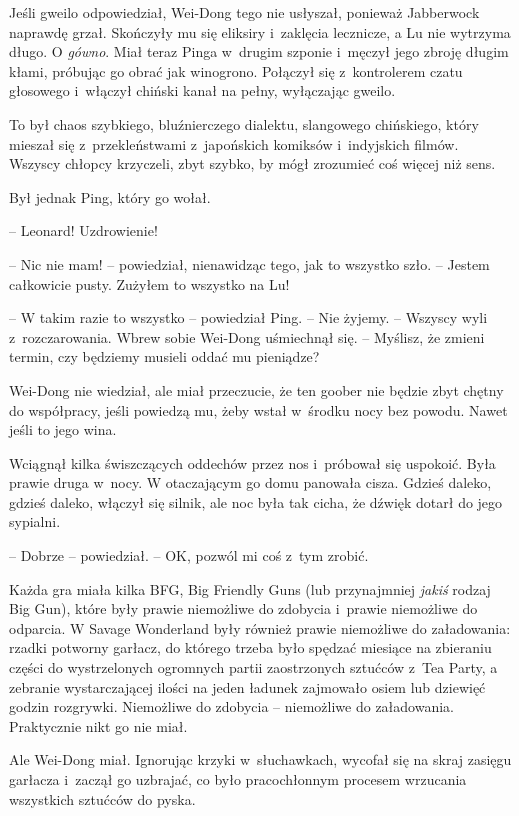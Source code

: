 \documentclass[oneside,polish,11pt,rmheadings]{mwbk}
\begin{document}
Jeśli gweilo odpowiedział, Wei-Dong tego nie usłyszał, ponieważ Jabberwock naprawdę grzał. Skończyły mu się eliksiry i~zaklęcia lecznicze, a Lu nie wytrzyma długo. O \textit{gówno}. Miał teraz Pinga w~drugim szponie i~męczył jego zbroję długim kłami, próbując go obrać jak winogrono. Połączył się z~kontrolerem czatu głosowego i~włączył chiński kanał na pełny, wyłączając gweilo. 


To był chaos szybkiego, bluźnierczego dialektu, slangowego chińskiego, który mieszał się z~przekleństwami z~japońskich komiksów i~indyjskich filmów. Wszyscy chłopcy krzyczeli, zbyt szybko, by mógł zrozumieć coś więcej niż sens. 


Był jednak Ping, który go wołał. 

-- Leonard! Uzdrowienie! 


-- Nic nie mam! -- powiedział, nienawidząc tego, jak to wszystko szło. -- Jestem całkowicie pusty. Zużyłem to wszystko na Lu!  


-- W takim razie to wszystko -- powiedział Ping. -- Nie żyjemy. -- Wszyscy wyli z~rozczarowania. Wbrew sobie Wei-Dong uśmiechnął się. -- Myślisz, że zmieni termin, czy będziemy musieli oddać mu pieniądze? 


Wei-Dong nie wiedział, ale miał przeczucie, że ten goober nie będzie zbyt chętny do współpracy, jeśli powiedzą mu, żeby wstał w~środku nocy bez powodu. Nawet jeśli to jego wina. 


Wciągnął kilka świszczących oddechów przez nos i~próbował się uspokoić. Była prawie druga w~nocy. W otaczającym go domu panowała cisza. Gdzieś daleko, gdzieś daleko, włączył się silnik, ale noc była tak cicha, że dźwięk dotarł do jego sypialni. 


-- Dobrze -- powiedział. -- OK, pozwól mi coś z~tym zrobić.  


Każda gra miała kilka BFG, Big Friendly Guns (lub przynajmniej \textit{jakiś }rodzaj Big Gun), które były prawie niemożliwe do zdobycia i~prawie niemożliwe do odparcia. W Savage Wonderland były również prawie niemożliwe do załadowania: rzadki potworny garłacz, do którego trzeba było spędzać miesiące na zbieraniu części do wystrzelonych ogromnych partii zaostrzonych sztućców z~Tea Party, a zebranie wystarczającej ilości na jeden ładunek zajmowało osiem lub dziewięć godzin rozgrywki. Niemożliwe do zdobycia -- niemożliwe do załadowania. Praktycznie nikt go nie miał. 


Ale Wei-Dong miał. Ignorując krzyki w~słuchawkach, wycofał się na skraj zasięgu garłacza i~zaczął go uzbrajać, co było pracochłonnym procesem wrzucania wszystkich sztućców do pyska.
\end{document}
